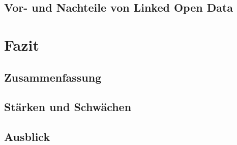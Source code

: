 \documentclass[a4paper, 11pt]{article}
\begin{document}
\subsection{Vor- und Nachteile von Linked Open Data}
\newpage
\section{Fazit}
\subsection{Zusammenfassung}
\subsection{Stärken und Schwächen}
\subsection{Ausblick}

  
\end{document}
